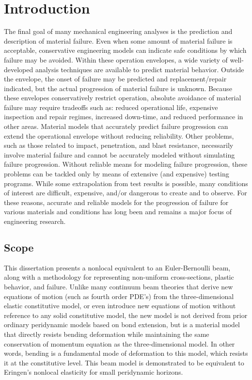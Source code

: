 \chapter{Introduction}

The final goal of many mechanical engineering analyses is the prediction and description of material failure.
Even when some amount of material failure is acceptable, conservative engineering models can indicate safe conditions by which failure may be avoided.
Within these operation envelopes, a wide variety of well-developed analysis techniques are available to predict material behavior.
Outside the envelope, the onset of failure may be predicted and replacement/repair indicated, but the actual progression of material failure is unknown.
Because these envelopes conservatively restrict operation, absolute avoidance of material failure may require tradeoffs such as: reduced operational life, expensive inspection and repair regimes, increased down-time, and reduced performance in other areas.
Material models that accurately predict failure progression can extend the operational envelope without reducing reliability.
Other problems, such as those related to impact, penetration, and blast resistance, necessarily involve material failure and cannot be accurately modeled without simulating failure progression.
Without reliable means for modeling failure progression, these problems can be tackled only by means of extensive (and expensive) testing programs.
While some extrapolation from test results is possible, many conditions of interest are difficult, expensive, and/or dangerous to create and to observe.
For these reasons, accurate and reliable models for the progression of failure for various materials and conditions has long been and remains a major focus of engineering research.


\section{Scope}

This dissertation presents a nonlocal equivalent to an Euler-Bernoulli beam, along with a methodology for representing non-uniform cross-sections, plastic behavior, and failure.
Unlike many continuum beam theories that derive new equations of motion (such as fourth order PDE's) from the three-dimensional elastic constitutive model, or even introduce new equations of motion without reference to any solid constitutive model, the new model is not derived from prior ordinary peridynamic models based on bond extension, but is a material model that directly resists bending deformation while maintaining the same conservation of momentum equation as the three-dimensional model.
In other words, bending is a fundamental mode of deformation to this model, which resists it at the constitutive level.
This beam model is demonstrated to be equivalent to Eringen's nonlocal elasticity for small peridynamic horizons.

